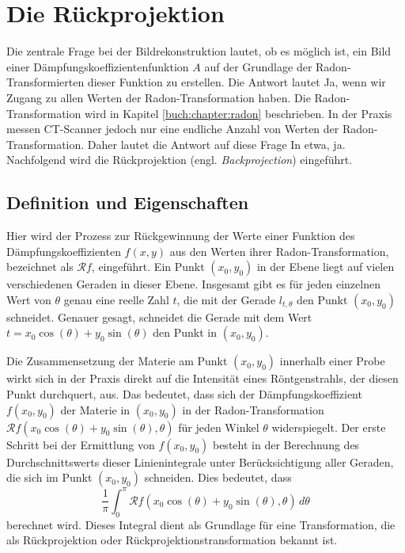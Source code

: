 %
%
%
%
\section{Die Rückprojektion
	\label{ct:section:ruekprojektion}}
Die zentrale Frage bei der Bildrekonstruktion lautet, ob es möglich ist, ein Bild einer Dämpfungskoeffizientenfunktion $A$ auf der Grundlage der Radon-Transformierten dieser Funktion zu erstellen. Die Antwort lautet \glqq Ja\grqq, wenn wir Zugang zu allen Werten der Radon-Transformation haben. Die Radon-Transformation wird in Kapitel \ref{buch:chapter:radon} beschrieben. In der Praxis messen CT-Scanner jedoch nur eine endliche Anzahl von Werten der Radon-Transformation. Daher lautet die Antwort auf diese Frage \glqq In etwa, ja\grqq. Nachfolgend wird die Rückprojektion (engl. \emph{Backprojection}) eingeführt.  

\subsection{Definition und Eigenschaften
	\label{ct:subsection:defnprop}}
Hier wird der Prozess zur Rückgewinnung der Werte einer Funktion des Dämpfungskoeffizienten $f(x, y)$ aus den Werten ihrer Radon-Transformation, bezeichnet als $\mathscr{R}f$, eingeführt. Ein Punkt $(x_0, y_0)$ in der Ebene liegt auf vielen verschiedenen Geraden in dieser Ebene. Insgesamt gibt es für jeden einzelnen Wert von $\theta$ genau eine reelle Zahl $t$, die mit der Gerade $l_{t,\theta}$ den Punkt $(x_0, y_0)$ schneidet. Genauer gesagt, schneidet die Gerade mit dem Wert $t = x_0\cos(\theta) + y_0\sin(\theta)$ den Punkt in $(x_0, y_0)$.  

Die Zusammensetzung der Materie am Punkt $(x_0, y_0)$ innerhalb einer Probe wirkt sich in der Praxis direkt auf die Intensität eines Röntgenstrahls, der diesen Punkt durchquert, aus. Das bedeutet, dass sich der Dämpfungskoeffizient $f(x_0, y_0)$ der Materie in $(x_0, y_0)$ in der Radon-Transformation $\mathscr{R}f(x_0\cos(\theta) + y_0\sin(\theta), \theta)$ für jeden Winkel $\theta$ widerspiegelt. Der erste Schritt bei der Ermittlung von $f(x_0, y_0)$ besteht in der Berechnung des Durchschnittswerts dieser Linienintegrale unter Berücksichtigung aller Geraden, die sich im Punkt $(x_0, y_0)$ schneiden. Dies bedeutet, dass
\begin{equation}
	\dfrac{1}{\pi}\int_{0}^{\pi} \mathscr{R}f(x_0\cos(\theta) + y_0\sin(\theta), \theta) \,d\theta
\end{equation}
berechnet wird. Dieses Integral dient als Grundlage für eine Transformation, die als Rückprojektion oder Rückprojektionstransformation bekannt ist.


